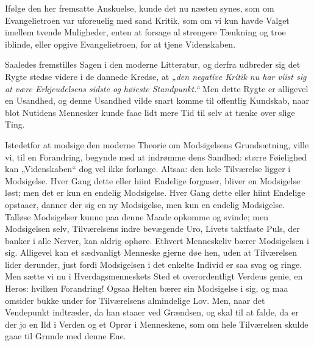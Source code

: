 \documentclass[12pt,a4paper]{book}
\begin{document}
Ifølge den her fremsatte Anskuelse, kunde det nu næsten synes, som om
Evangelietroen var uforeuelig med sand Kritik, som om vi kun havde Valget imellem
tvende Muligheder, enten at forsage al strengere Tænkning og troe iblinde, eller
opgive Evangelietroen, for at tjene Videnskaben.

Saaledes fremstilles Sagen i den moderne Litteratur, og derfra udbreder sig det
Rygte stedse videre i de dannede Kredse, at
\emph{„den negative Kritik nu har viist sig at være Erkjeudelsens sidste og
høieste Standpunkt.“} Men dette Rygte er alligevel en Usandhed, og denne Usandhed
vilde snart komme til offentlig Kundskab, naar blot Nutidens Mennesker kunde faae
lidt mere Tid til selv at tænke over slige Ting.

Istedetfor at modsige den moderne Theorie om Modsigelsens Grundsætning, ville vi,
til en Forandring, begynde med at indrømme dens Sandhed: større Føielighed kan
„Videnskaben“ dog vel ikke forlange. Altsaa: den hele Tilværelse ligger i
Modsigelse. Hver Gang dette eller hiint Endelige forgaaer, bliver en Modsigelse
løst; men det er kun en endelig Modsigelse. Hver Gang dette eller hiint Endelige
opstaaer, danner der sig en ny Modsigelse, men kun en endelig Modsigelse. Talløse
Modsigelser kunne paa denne Maade opkomme og svinde; men Modsigelsen selv,
Tilværelsens indre bevægende Uro, Livets taktfaste Puls, der banker i alle
Nerver, kan aldrig ophøre. Ethvert Menneskeliv bærer Modsigelsen i sig. Alligevel
kan et sædvanligt Menneske gjerne døe hen, uden at Tilværelsen lider derunder,
just fordi Modsigelsen i det enkelte Individ er saa svag og ringe. Men sætte vi
nu i Hverdagsmenneskets Sted et overordentligt
Verdeus\-%
genie, en Heros: hvilken Forandring! Ogsaa Helten bærer sin Modsigelse i sig, og
maa omsider bukke under for Tilværelsens almindelige Lov. Men, naar det
Vendepunkt indtræder, da han staaer ved Grændsen, og skal til at falde, da er der
jo en Ild i Verden og et Oprør i Menneskene, som om hele Tilværelsen skulde gaae
til
Grnnde med denne Ene.
\end{document}
